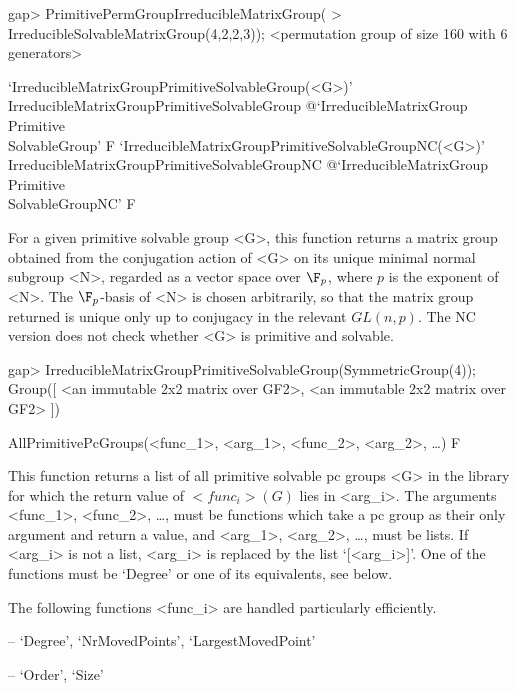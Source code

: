 \beginexample
gap> PrimitivePermGroupIrreducibleMatrixGroup(
>       IrreducibleSolvableMatrixGroup(4,2,2,3));
<permutation group of size 160 with 6 generators>
\endexample

\>`IrreducibleMatrixGroupPrimitiveSolvableGroup(<G>)'%
{IrreducibleMatrixGroupPrimitiveSolvableGroup}%
@{`IrreducibleMatrixGroup\\Primitive\\SolvableGroup'} F
\>`IrreducibleMatrixGroupPrimitiveSolvableGroupNC(<G>)'%
{IrreducibleMatrixGroupPrimitiveSolvableGroupNC}%
@{`IrreducibleMatrixGroup\\Primitive\\SolvableGroupNC'} F

For a given primitive solvable group <G>, this function returns a matrix group 
obtained from the conjugation
action of <G> on its unique minimal normal subgroup <N>, regarded as a vector 
space over $\F_p$, where $p$ is the exponent of <N>. 
The $\F_p$-basis of <N> is chosen arbitrarily, so that the matrix group returned 
is unique only up to conjugacy in the relevant $GL(n, p)$. The NC version does
not check whether <G> is primitive and solvable.

\beginexample
gap> IrreducibleMatrixGroupPrimitiveSolvableGroup(SymmetricGroup(4));
Group([ <an immutable 2x2 matrix over GF2>, 
  <an immutable 2x2 matrix over GF2> ])
\endexample


\>AllPrimitivePcGroups(<func_1>, <arg_1>, <func_2>, <arg_2>, \dots) F

This function returns a list of all primitive solvable pc
groups <G> in the  {\IRREDSOL} library for which the return value of $<func_i>(G)$ lies
in <arg_i>.  The arguments <func_1>, <func_2>, \dots,
must be {\GAP} functions which take a pc group as their only argument and return a
value, and <arg_1>, <arg_2>,
\dots,  must be lists. If <arg_i> is not a list, <arg_i> is replaced by the list
`[<arg_i>]'. One of the functions must be `Degree' or one of its
equivalents, see below.

The following functions <func_i> are handled particularly efficiently.

\beginlist
\item{--} `Degree', `NrMovedPoints', `LargestMovedPoint'
\item{--} `Order', `Size'
\endlist

